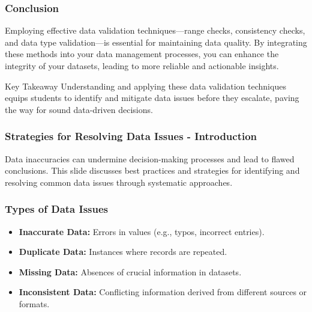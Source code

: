 \documentclass{beamer}
\begin{document}
\begin{frame}[fragile]
    \frametitle{Conclusion}
    
    Employing effective data validation techniques—range checks, consistency checks, and data type validation—is essential for maintaining data quality. By integrating these methods into your data management processes, you can enhance the integrity of your datasets, leading to more reliable and actionable insights.
    
    \begin{block}{Key Takeaway}
        Understanding and applying these data validation techniques equips students to identify and mitigate data issues before they escalate, paving the way for sound data-driven decisions.
    \end{block}
\end{frame}

\begin{frame}[fragile]
    \frametitle{Strategies for Resolving Data Issues - Introduction}
    Data inaccuracies can undermine decision-making processes and lead to flawed conclusions. This slide discusses best practices and strategies for identifying and resolving common data issues through systematic approaches.
\end{frame}

\begin{frame}[fragile]
    \frametitle{Types of Data Issues}
    \begin{itemize}
        \item \textbf{Inaccurate Data:} Errors in values (e.g., typos, incorrect entries).
        \item \textbf{Duplicate Data:} Instances where records are repeated.
        \item \textbf{Missing Data:} Absences of crucial information in datasets.
        \item \textbf{Inconsistent Data:} Conflicting information derived from different sources or formats.
    \end{itemize}
\end{frame}
\end{document}
